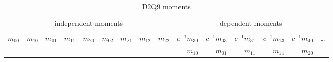 \setlength{\tabcolsep}{2.9pt}
\begin{table} [t]
  \centering
  \begin{tabular}{r rr rrr rr r rrrrr r}
    \toprule
    \multicolumn{9}{c}{independent moments} & \multicolumn{6}{c}{dependent moments}   \\
    \cmidrule(lr){1-9}\cmidrule(lr){10-15} \\
    $m_{00}$
    & $m_{10}$
    & $m_{01}$
    & $m_{11}$
    & $m_{20}$
    & $m_{02}$
    & $m_{21}$
    & $m_{12}$
    & $m_{22}$
    & $c^{-1}m_{30}$
    & $c^{-1}m_{03}$
    & $c^{-1}m_{31}$
    & $c^{-1}m_{13}$
    & $c^{-1}m_{40}$
    & \ldots \\
    &&&&&&&&
    & = $m_{10}$
    & = $m_{01}$
    & = $m_{11}$
    & = $m_{11}$
    & = $m_{20}$ & \\
    \bottomrule
  \end{tabular}
  \caption{D2Q9 moments}\label{table:D2Q9 moments}
\end{table}
